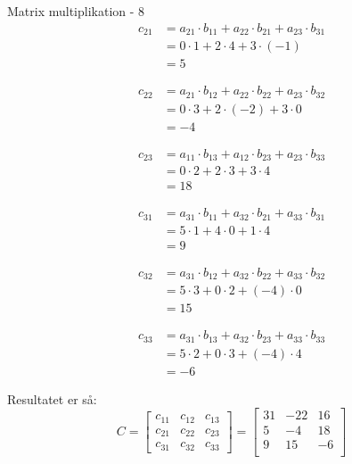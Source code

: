 \documentclass{article}
\begin{document}
\begin{exercise}{Matrix multiplikation - 8}
	\hint
	\begin{align*}
		c_{21} & = a_{21} \cdot b_{11} + a_{22} \cdot b_{21} + a_{23} \cdot b_{31} \\
		& = 0 \cdot 1 + 2 \cdot 4 + 3 \cdot (-1) \\
		& =5
	\end{align*}
	
	\hint
	\begin{align*}
		c_{22} & = a_{21} \cdot b_{12} + a_{22} \cdot b_{22} + a_{23} \cdot b_{32}  \\
		& = 0 \cdot 3 + 2 \cdot (-2) + 3 \cdot 0 \\
		& = -4
	\end{align*}
	
	\hint
	\begin{align*}
		c_{23} & = a_{11} \cdot b_{13} + a_{12} \cdot b_{23} + a_{23} \cdot b_{33}   \\
		& = 0 \cdot 2 + 2 \cdot 3 + 3 \cdot 4\\
		& = 18
	\end{align*}
	
	\hint
	\begin{align*}
		c_{31} & = a_{31} \cdot b_{11} + a_{32} \cdot b_{21} + a_{33} \cdot b_{31} \\
		& = 5 \cdot 1 + 4 \cdot 0 + 1 \cdot 4 \\
		& = 9
	\end{align*}	
	
	\hint
	\begin{align*}
		c_{32} & = a_{31} \cdot b_{12} + a_{32} \cdot b_{22} + a_{33} \cdot b_{32}  \\
		& = 5 \cdot 3 + 0 \cdot 2 + (-4) \cdot 0\\
		& = 15
	\end{align*}
	
	\hint
	\begin{align*}
		c_{33} & = a_{31} \cdot b_{13} + a_{32} \cdot b_{23} + a_{33} \cdot b_{33} \\
		& = 5 \cdot 2 + 0 \cdot 3 + (-4) \cdot 4\\
		& = -6
	\end{align*}	
	
	
	
	\hint
	Resultatet er så:
	\[
	C = \left[\begin{array}{rrr}
	c_{11} & c_{12} & c_{13} \\
	c_{21} & c_{22} & c_{23} \\
	c_{31} & c_{32} & c_{33}
	\end{array} \right] = 
	\left[\begin{array}{rrr}
	31 & -22 & 16 \\
	5 & -4 & 18 \\
	9 & 15 & -6 \\
	\end{array} \right]
	\]
	
	
\end{exercise}
\end{document}
